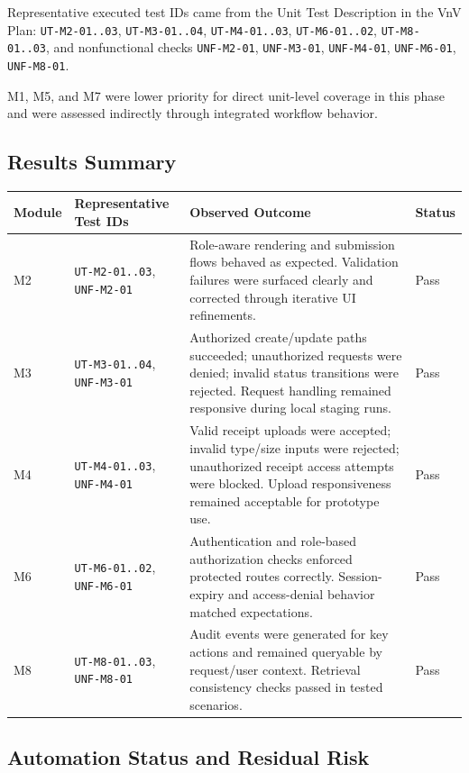 \documentclass[12pt, titlepage]{article}
\begin{document}
Representative executed test IDs came from the Unit Test Description in the VnV
Plan: \texttt{UT-M2-01..03}, \texttt{UT-M3-01..04}, \texttt{UT-M4-01..03},
\texttt{UT-M6-01..02}, \texttt{UT-M8-01..03}, and nonfunctional checks
\texttt{UNF-M2-01}, \texttt{UNF-M3-01}, \texttt{UNF-M4-01},
\texttt{UNF-M6-01}, \texttt{UNF-M8-01}.

M1, M5, and M7 were lower priority for direct unit-level coverage in this
phase and were assessed indirectly through integrated workflow behavior.

\subsection{Results Summary}

\renewcommand{\arraystretch}{1.2}
\begin{tabularx}{\textwidth}{>{\raggedright\arraybackslash}p{1.6cm} >{\raggedright\arraybackslash}p{4.0cm} X >{\raggedright\arraybackslash}p{1.5cm}}
\toprule
\textbf{Module} & \textbf{Representative Test IDs} & \textbf{Observed Outcome} & \textbf{Status}\\
\midrule
M2 & \texttt{UT-M2-01..03}, \texttt{UNF-M2-01} & Role-aware rendering and submission flows behaved as expected. Validation failures were surfaced clearly and corrected through iterative UI refinements. & Pass\\
M3 & \texttt{UT-M3-01..04}, \texttt{UNF-M3-01} & Authorized create/update paths succeeded; unauthorized requests were denied; invalid status transitions were rejected. Request handling remained responsive during local staging runs. & Pass\\
M4 & \texttt{UT-M4-01..03}, \texttt{UNF-M4-01} & Valid receipt uploads were accepted; invalid type/size inputs were rejected; unauthorized receipt access attempts were blocked. Upload responsiveness remained acceptable for prototype use. & Pass\\
M6 & \texttt{UT-M6-01..02}, \texttt{UNF-M6-01} & Authentication and role-based authorization checks enforced protected routes correctly. Session-expiry and access-denial behavior matched expectations. & Pass\\
M8 & \texttt{UT-M8-01..03}, \texttt{UNF-M8-01} & Audit events were generated for key actions and remained queryable by request/user context. Retrieval consistency checks passed in tested scenarios. & Pass\\
\bottomrule
\end{tabularx}

\subsection{Automation Status and Residual Risk}
\end{document}
